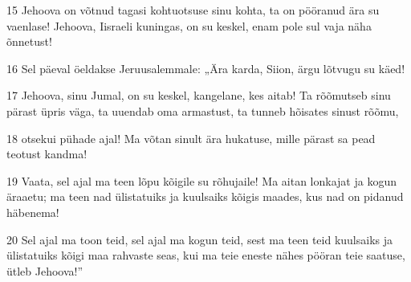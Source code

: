 \par 15 Jehoova on võtnud tagasi kohtuotsuse sinu kohta, ta on pööranud ära su vaenlase! Jehoova, Iisraeli kuningas, on su keskel, enam pole sul vaja näha õnnetust!
\par 16 Sel päeval öeldakse Jeruusalemmale: „Ära karda, Siion, ärgu lõtvugu su käed!
\par 17 Jehoova, sinu Jumal, on su keskel, kangelane, kes aitab! Ta rõõmutseb sinu pärast üpris väga, ta uuendab oma armastust, ta tunneb hõisates sinust rõõmu,
\par 18 otsekui pühade ajal! Ma võtan sinult ära hukatuse, mille pärast sa pead teotust kandma!
\par 19 Vaata, sel ajal ma teen lõpu kõigile su rõhujaile! Ma aitan lonkajat ja kogun äraaetu; ma teen nad ülistatuiks ja kuulsaiks kõigis maades, kus nad on pidanud häbenema!
\par 20 Sel ajal ma toon teid, sel ajal ma kogun teid, sest ma teen teid kuulsaiks ja ülistatuiks kõigi maa rahvaste seas, kui ma teie eneste nähes pööran teie saatuse, ütleb Jehoova!”




